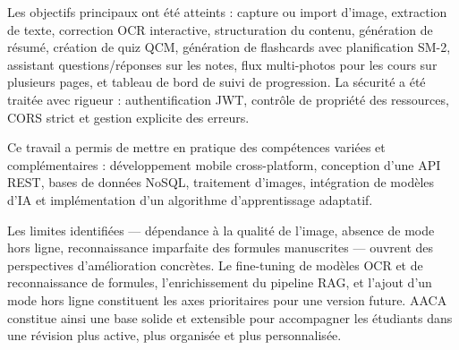 \documentclass[12pt,a4paper]{report}
\begin{document}
Les objectifs principaux ont été atteints : capture ou import d'image, extraction de texte, correction OCR interactive, structuration du contenu, génération de résumé, création de quiz QCM, génération de flashcards avec planification SM-2, assistant questions/réponses sur les notes, flux multi-photos pour les cours sur plusieurs pages, et tableau de bord de suivi de progression. La sécurité a été traitée avec rigueur : authentification JWT, contrôle de propriété des ressources, CORS strict et gestion explicite des erreurs.

Ce travail a permis de mettre en pratique des compétences variées et complémentaires : développement mobile cross-platform, conception d'une API REST, bases de données NoSQL, traitement d'images, intégration de modèles d'IA et implémentation d'un algorithme d'apprentissage adaptatif.

Les limites identifiées — dépendance à la qualité de l'image, absence de mode hors ligne, reconnaissance imparfaite des formules manuscrites — ouvrent des perspectives d'amélioration concrètes. Le fine-tuning de modèles OCR et de reconnaissance de formules, l'enrichissement du pipeline RAG, et l'ajout d'un mode hors ligne constituent les axes prioritaires pour une version future. AACA constitue ainsi une base solide et extensible pour accompagner les étudiants dans une révision plus active, plus organisée et plus personnalisée.
\end{document}
